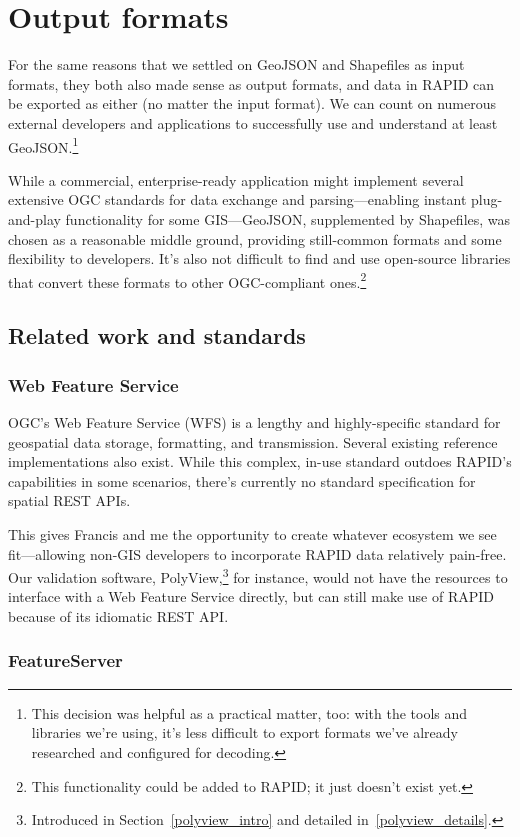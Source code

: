 \section{Output formats}
For the same reasons that we settled on GeoJSON and Shapefiles as input formats, they both also made sense as output formats, and data in RAPID can be exported as either (no matter the input format). We can count on numerous external developers and applications to successfully use and understand at least GeoJSON.\footnote{This decision was helpful as a practical matter, too: with the tools and libraries we're using, it's less difficult to export formats we've already researched and configured for decoding.}

While a commercial, enterprise-ready application might implement several extensive OGC standards for data exchange and parsing---enabling instant plug-and-play functionality for some GIS---GeoJSON, supplemented by Shapefiles, was chosen as a reasonable middle ground, providing still-common formats and some flexibility to developers. It's also not difficult to find and use open-source libraries that convert these formats to other OGC-compliant ones.\footnote{This functionality could be added to RAPID; it just doesn't exist yet.}

\subsection{Related work and standards}
\subsubsection{Web Feature Service}
OGC's Web Feature Service (WFS) is a lengthy and highly-specific standard for geospatial data storage, formatting, and transmission. Several existing reference implementations also exist. While this complex, in-use standard outdoes RAPID's capabilities in some scenarios, there's currently no standard specification for spatial REST APIs.

This gives Francis and me the opportunity to create whatever ecosystem we see fit---allowing non-GIS developers to incorporate RAPID data relatively pain-free. Our validation software, PolyView,\footnote{Introduced in Section~\ref{polyview_intro} and detailed in~\ref{polyview_details}.} for instance, would not have the resources to interface with a Web Feature Service directly, but can still make use of RAPID because of its idiomatic REST API.

\subsubsection{FeatureServer}

